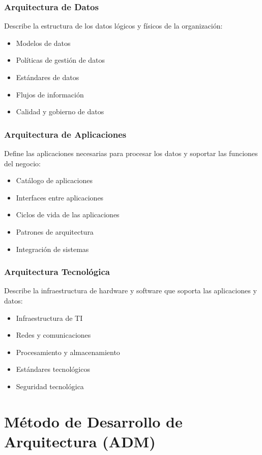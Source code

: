 \subsubsection{Arquitectura de Datos}
Describe la estructura de los datos lógicos y físicos de la organización:
\begin{itemize}
\item Modelos de datos
\item Políticas de gestión de datos
\item Estándares de datos
\item Flujos de información
\item Calidad y gobierno de datos
\end{itemize}

\subsubsection{Arquitectura de Aplicaciones}
Define las aplicaciones necesarias para procesar los datos y soportar las funciones del negocio:
\begin{itemize}
\item Catálogo de aplicaciones
\item Interfaces entre aplicaciones
\item Ciclos de vida de las aplicaciones
\item Patrones de arquitectura
\item Integración de sistemas
\end{itemize}

\subsubsection{Arquitectura Tecnológica}
Describe la infraestructura de hardware y software que soporta las aplicaciones y datos:
\begin{itemize}
\item Infraestructura de TI
\item Redes y comunicaciones
\item Procesamiento y almacenamiento
\item Estándares tecnológicos
\item Seguridad tecnológica
\end{itemize}

\section{Método de Desarrollo de Arquitectura (ADM)}

